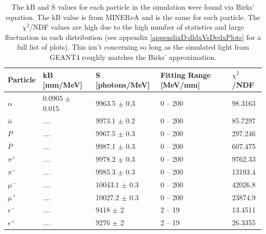 \begin{table}[!h]
\centering
\begin{tabular}{lllll}  
\toprule
Particle       & kB [mm/MeV]        & S [photons/MeV]   & Fitting Range [MeV/mm] & $\chi^2$/NDF\\
\midrule
$\alpha$       & 0.0905 $\pm$ 0.015 & 9963.5  $\pm$ 0.3 & 0 -- 200               & 98.3163 \\
$\bar{\alpha}$ & ....               & 9973.1  $\pm$ 0.2 & 0 -- 200               & 85.7297 \\
$P$            & ....               & 9967.5  $\pm$ 0.3 & 0 -- 200               & 297.246 \\
$\bar{P}$      & ....               & 9987.1  $\pm$ 0.3 & 0 -- 200               & 607.475 \\
$\pi^+$        & ....               & 9978.2  $\pm$ 0.3 & 0 -- 200               & 9762.33 \\
$\pi^-$        & ....               & 9985.3  $\pm$ 0.3 & 0 -- 200               & 13193.4 \\
$\mu^-$        & ....               & 10043.1 $\pm$ 0.3 & 0 -- 200               & 42026.8 \\
$\mu^+$        & ....               & 10027.2 $\pm$ 0.3 & 0 -- 200               & 23874.9 \\
$e^-$          & ....               & 9418    $\pm$ 2   & 2 -- 19                & 13.4511 \\
$e^+$          & ....               & 9276    $\pm$ 2   & 2 -- 19                & 26.3355 \\
\bottomrule  
\end{tabular}
\caption{The kB and S values for each particle in the simulation were found via Birks' equation. The kB value is from MINER$\nu$A and is the same for each particle. The $\chi^2$/NDF values are high due to the high number of statistics and large fluctuation in each distribution (see appendix  \ref{appendixD:dldxVsDedxPlots} for a full list of plots). This isn't concerning so long as the simulated light from GEANT4 roughly matches the Birks' approximation.}
\label{tab:sValueTable}
\end{table}

